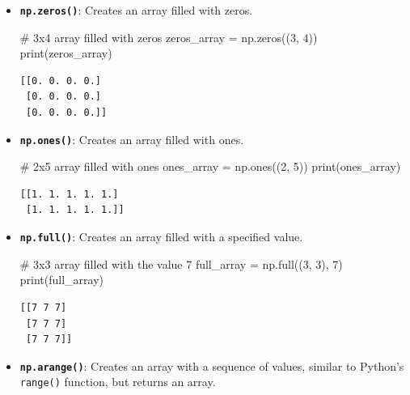 \documentclass[
  letterpaper,
  DIV=11,
  numbers=noendperiod]{scrreprt}
\newenvironment{Shaded}{\begin{snugshade}}{\end{snugshade}}
\newcommand{\BuiltInTok}[1]{\textcolor[rgb]{0.00,0.23,0.31}{#1}}
\newcommand{\CommentTok}[1]{\textcolor[rgb]{0.37,0.37,0.37}{#1}}
\newcommand{\DecValTok}[1]{\textcolor[rgb]{0.68,0.00,0.00}{#1}}
\newcommand{\NormalTok}[1]{\textcolor[rgb]{0.00,0.23,0.31}{#1}}
\newcommand{\OperatorTok}[1]{\textcolor[rgb]{0.37,0.37,0.37}{#1}}
\begin{document}
\begin{itemize}
\item
  \textbf{\texttt{np.zeros()}}: Creates an array filled with zeros.

\begin{Shaded}
\begin{Highlighting}[]
\CommentTok{\# 3x4 array filled with zeros}
\NormalTok{zeros\_array }\OperatorTok{=}\NormalTok{ np.zeros((}\DecValTok{3}\NormalTok{, }\DecValTok{4}\NormalTok{))  }
\BuiltInTok{print}\NormalTok{(zeros\_array)}
\end{Highlighting}
\end{Shaded}

\begin{verbatim}
[[0. 0. 0. 0.]
 [0. 0. 0. 0.]
 [0. 0. 0. 0.]]
\end{verbatim}
\item
  \textbf{\texttt{np.ones()}}: Creates an array filled with ones.

\begin{Shaded}
\begin{Highlighting}[]
\CommentTok{\# 2x5 array filled with ones}
\NormalTok{ones\_array }\OperatorTok{=}\NormalTok{ np.ones((}\DecValTok{2}\NormalTok{, }\DecValTok{5}\NormalTok{))  }
\BuiltInTok{print}\NormalTok{(ones\_array)}
\end{Highlighting}
\end{Shaded}

\begin{verbatim}
[[1. 1. 1. 1. 1.]
 [1. 1. 1. 1. 1.]]
\end{verbatim}
\item
  \textbf{\texttt{np.full()}}: Creates an array filled with a specified
  value.

\begin{Shaded}
\begin{Highlighting}[]
\CommentTok{\# 3x3 array filled with the value 7}
\NormalTok{full\_array }\OperatorTok{=}\NormalTok{ np.full((}\DecValTok{3}\NormalTok{, }\DecValTok{3}\NormalTok{), }\DecValTok{7}\NormalTok{)  }
\BuiltInTok{print}\NormalTok{(full\_array)}
\end{Highlighting}
\end{Shaded}

\begin{verbatim}
[[7 7 7]
 [7 7 7]
 [7 7 7]]
\end{verbatim}
\item
  \textbf{\texttt{np.arange()}}: Creates an array with a sequence of
  values, similar to Python's \texttt{range()} function, but returns an
  array.


\end{itemize}
\end{document}
